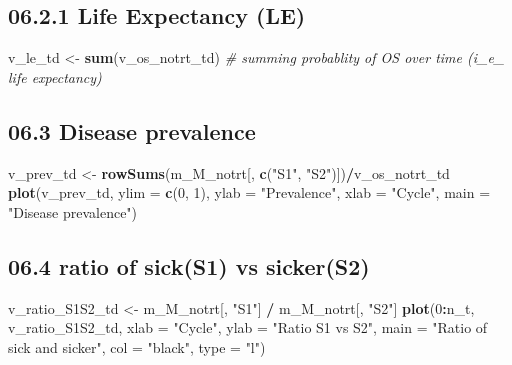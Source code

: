 \documentclass[
]{article}
\newenvironment{Shaded}{\begin{snugshade}}{\end{snugshade}}
\newcommand{\CommentTok}[1]{\textcolor[rgb]{0.56,0.35,0.01}{\textit{#1}}}
\newcommand{\DataTypeTok}[1]{\textcolor[rgb]{0.13,0.29,0.53}{#1}}
\newcommand{\DecValTok}[1]{\textcolor[rgb]{0.00,0.00,0.81}{#1}}
\newcommand{\KeywordTok}[1]{\textcolor[rgb]{0.13,0.29,0.53}{\textbf{#1}}}
\newcommand{\NormalTok}[1]{#1}
\newcommand{\OperatorTok}[1]{\textcolor[rgb]{0.81,0.36,0.00}{\textbf{#1}}}
\newcommand{\StringTok}[1]{\textcolor[rgb]{0.31,0.60,0.02}{#1}}
\begin{document}
\hypertarget{life-expectancy-le}{%
\subsection{06.2.1 Life Expectancy (LE)}\label{life-expectancy-le}}

\begin{Shaded}
\begin{Highlighting}[]
\NormalTok{v_le_td <-}\StringTok{ }\KeywordTok{sum}\NormalTok{(v_os_notrt_td) }\CommentTok{# summing probablity of OS over time (i_e_ life expectancy)}
\end{Highlighting}
\end{Shaded}

\hypertarget{disease-prevalence}{%
\subsection{06.3 Disease prevalence}\label{disease-prevalence}}

\begin{Shaded}
\begin{Highlighting}[]
\NormalTok{v_prev_td <-}\StringTok{ }\KeywordTok{rowSums}\NormalTok{(m_M_notrt[, }\KeywordTok{c}\NormalTok{(}\StringTok{"S1"}\NormalTok{, }\StringTok{"S2"}\NormalTok{)])}\OperatorTok{/}\NormalTok{v_os_notrt_td}
\KeywordTok{plot}\NormalTok{(v_prev_td,}
     \DataTypeTok{ylim =} \KeywordTok{c}\NormalTok{(}\DecValTok{0}\NormalTok{, }\DecValTok{1}\NormalTok{),}
     \DataTypeTok{ylab =} \StringTok{"Prevalence"}\NormalTok{,}
     \DataTypeTok{xlab =} \StringTok{"Cycle"}\NormalTok{,}
     \DataTypeTok{main =} \StringTok{"Disease prevalence"}\NormalTok{)}
\end{Highlighting}
\end{Shaded}

\hypertarget{ratio-of-sicks1-vs-sickers2}{%
\subsection{06.4 ratio of sick(S1) vs
sicker(S2)}\label{ratio-of-sicks1-vs-sickers2}}

\begin{Shaded}
\begin{Highlighting}[]
\NormalTok{v_ratio_S1S2_td <-}\StringTok{ }\NormalTok{m_M_notrt[, }\StringTok{"S1"}\NormalTok{] }\OperatorTok{/}\StringTok{ }\NormalTok{m_M_notrt[, }\StringTok{"S2"}\NormalTok{]}
\KeywordTok{plot}\NormalTok{(}\DecValTok{0}\OperatorTok{:}\NormalTok{n_t, v_ratio_S1S2_td,}
     \DataTypeTok{xlab =} \StringTok{"Cycle"}\NormalTok{, }
     \DataTypeTok{ylab =} \StringTok{"Ratio S1 vs S2"}\NormalTok{, }
     \DataTypeTok{main =} \StringTok{"Ratio of sick and sicker"}\NormalTok{, }
     \DataTypeTok{col =} \StringTok{"black"}\NormalTok{, }\DataTypeTok{type =} \StringTok{"l"}\NormalTok{)}
\end{Highlighting}
\end{Shaded}
\end{document}
